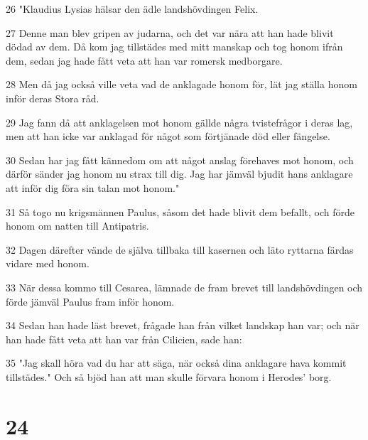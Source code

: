 \par 26 "Klaudius Lysias hälsar den ädle landshövdingen Felix.
\par 27 Denne man blev gripen av judarna, och det var nära att han hade blivit dödad av dem. Då kom jag tillstädes med mitt manskap och tog honom ifrån dem, sedan jag hade fått veta att han var romersk medborgare.
\par 28 Men då jag också ville veta vad de anklagade honom för, lät jag ställa honom inför deras Stora råd.
\par 29 Jag fann då att anklagelsen mot honom gällde några tvistefrågor i deras lag, men att han icke var anklagad för något som förtjänade död eller fängelse.
\par 30 Sedan har jag fått kännedom om att något anslag förehaves mot honom, och därför sänder jag honom nu strax till dig. Jag har jämväl bjudit hans anklagare att inför dig föra sin talan mot honom."
\par 31 Så togo nu krigsmännen Paulus, såsom det hade blivit dem befallt, och förde honom om natten till Antipatris.
\par 32 Dagen därefter vände de själva tillbaka till kasernen och läto ryttarna färdas vidare med honom.
\par 33 När dessa kommo till Cesarea, lämnade de fram brevet till landshövdingen och förde jämväl Paulus fram inför honom.
\par 34 Sedan han hade läst brevet, frågade han från vilket landskap han var; och när han hade fått veta att han var från Cilicien, sade han:
\par 35 "Jag skall höra vad du har att säga, när också dina anklagare hava kommit tillstädes." Och så bjöd han att man skulle förvara honom i Herodes' borg.

\chapter{24}

